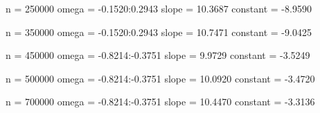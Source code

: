 \documentclass{article}
\begin{document}
n = 250000
omega = -0.1520:0.2943
slope = 10.3687
constant = -8.9590

n = 350000
omega = -0.1520:0.2943
slope = 10.7471
constant = -9.0425

n = 450000
omega = -0.8214:-0.3751
slope = 9.9729
constant = -3.5249

n = 500000
omega = -0.8214:-0.3751
slope = 10.0920
constant = -3.4720

n = 700000
omega = -0.8214:-0.3751
slope = 10.4470
constant = -3.3136
\end{document}
